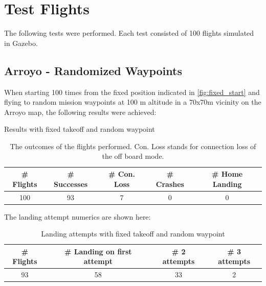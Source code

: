 \section{Test Flights}\label{sec:test_flights}

The following tests were performed. Each test consisted of 100 flights simulated in Gazebo.

\subsection{Arroyo - Randomized Waypoints}\label{subsec:eval_rand_wp}

When starting 100 times from the fixed position indicated in \cref{fig:fixed_start} and flying to random mission waypoints at 100 m altitude in a 70x70m vicinity on the Arroyo map, the following results were achieved:

\begin{table}[h]
    \begin{center}
     \caption{Results with fixed takeoff and random waypoint}\vspace{1ex}
     \label{tab:result_random_waypoint}
     \begin{tabular}{|c|c|c|c|c|}
     \hline
     \# Flights & \# Successes & \# Con. Loss & \# Crashes & \# Home Landing\\ \hline \hline
     100 & 93 & 7 & 0 & 0 \\
     \hline
     \end{tabular}
     \caption{The outcomes of the flights performed. Con. Loss stands for connection loss of the off board mode.}
    \end{center}
    \end{table}

    The landing attempt numerics are shown here:

    \begin{table}[h]
        \begin{center}
         \caption{Landing attempts with fixed takeoff and random waypoint}\vspace{1ex}
         \label{tab:land_nums_random_waypoint}
         \begin{tabular}{|c|c|c|c|}
         \hline
         \# Flights & \# Landing on first attempt & \# 2 attempts & \# 3 attempts\\ \hline \hline
         93 & 58 & 33 & 2 \\
         \hline
         \end{tabular}
        \end{center}
    \end{table}

